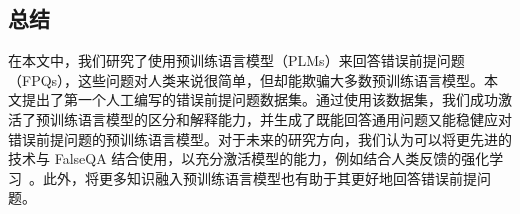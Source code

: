 \begin{table*}[]
    \centering
    \caption{使用数据回放技术训练的模型在所有种子中仍然能够反驳的 ARC-DA 数据集中的所有问题。第一个和第五个问题并非不完整，因为它们采用了句子续写的形式。}
    \label{tab:still_rebut}
\end{table*}

\subsection{总结}
在本文中，我们研究了使用预训练语言模型（PLMs）来回答错误前提问题（FPQs），这些问题对人类来说很简单，但却能欺骗大多数预训练语言模型。本文提出了第一个人工编写的错误前提问题数据集。通过使用该数据集，我们成功激活了预训练语言模型的区分和解释能力，并生成了既能回答通用问题又能稳健应对错误前提问题的预训练语言模型。对于未来的研究方向，我们认为可以将更先进的技术与 FalseQA 结合使用，以充分激活模型的能力，例如结合人类反馈的强化学习~\cite{ouyang2022training}。此外，将更多知识融入预训练语言模型也有助于其更好地回答错误前提问题。

